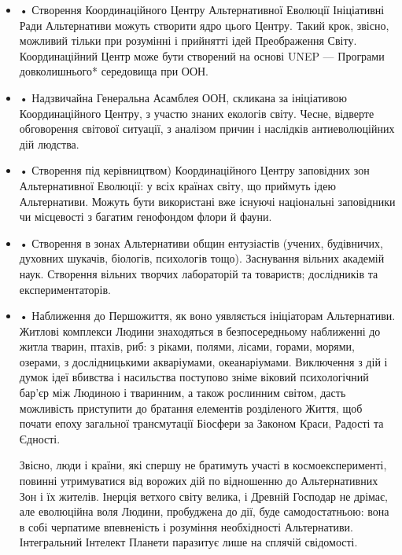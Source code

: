 \begin{itemize}
	
\item • Створення Координаційного Центру Альтернативної Еволюції Ініціативні Ради
Альтернативи можуть створити ядро цього Центру. Такий крок, звісно, можливий
тільки при розумінні і прийнятті ідей Преображення Світу. Координаційний Центр
може бути створений на основі UNEP — Програми довколишнього* середовища при
ООН.

\item • Надзвичайна Генеральна Асамблея ООН, скликана за ініціативою Координаційного Центру, з участю знаних екологів світу. Чесне, відверте обговорення світової ситуації, з аналізом причин і наслідків антиеволюційних дій людства.

\item • Створення під керівництвом) Координаційного Центру заповідних зон Альтернативної Еволюції: у всіх країнах світу, що приймуть ідею Альтернативи. Можуть бути використані вже існуючі національні заповідники чи місцевості з багатим генофондом флори й фауни.

\item • Створення в зонах Альтернативи общин ентузіастів (учених, будівничих, духовних шукачів, біологів, психологів тощо). Заснування вільних академій наук. Створення вільних творчих лабораторій та товариств; дослідників та експериментаторів.

\item • Наближення до Першожиття, як воно уявляється ініціаторам Альтернативи. Житлові комплекси Людини знаходяться в безпосередньому наближенні до житла тварин, птахів, риб: з ріками, полями, лісами, горами, морями, озерами, з дослідницькими акваріумами, океанаріумами. Виключення з дій і думок ідеї вбивства і насильства поступово зніме віковий психологічний бар’єр між Людиною і тваринним, а також рослинним світом, дасть можливість приступити до братання елементів розділеного Життя, щоб почати епоху загальної трансмутації Біосфери за Законом Краси, Радості та Єдності.

Звісно, люди і країни, які спершу не братимуть участі в космоексперименті,
повинні утримуватися від ворожих дій по відношенню до
Альтернативних Зон і їх жителів. Інерція ветхого світу велика,
і Древній Господар не дрімає, але еволюційна воля Людини,
пробуджена до дії, буде самодостатньою: вона в собі черпатиме
впевненість і розуміння необхідності Альтернативи. Інтегральний
Інтелект Планети паразитує лише на сплячій свідомості.


\end{itemize}
